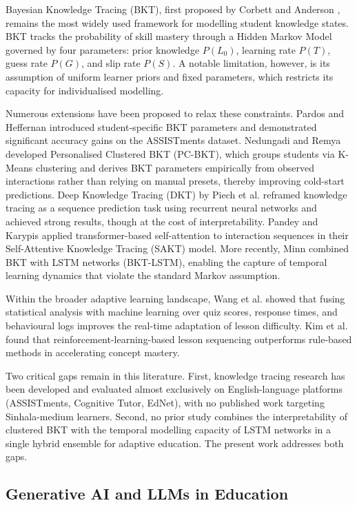 \documentclass[conference]{IEEEtran}
\begin{document}
Bayesian Knowledge Tracing (BKT), first proposed by Corbett and Anderson \cite{b14}, remains the most widely used framework for modelling student knowledge states. BKT tracks the probability of skill mastery through a Hidden Markov Model governed by four parameters: prior knowledge $P(L_0)$, learning rate $P(T)$, guess rate $P(G)$, and slip rate $P(S)$. A notable limitation, however, is its assumption of uniform learner priors and fixed parameters, which restricts its capacity for individualised modelling.

Numerous extensions have been proposed to relax these constraints. Pardos and Heffernan \cite{b15} introduced student-specific BKT parameters and demonstrated significant accuracy gains on the ASSISTments dataset. Nedungadi and Remya \cite{b16} developed Personalised Clustered BKT (PC-BKT), which groups students via K-Means clustering and derives BKT parameters empirically from observed interactions rather than relying on manual presets, thereby improving cold-start predictions. Deep Knowledge Tracing (DKT) by Piech et al. \cite{b17} reframed knowledge tracing as a sequence prediction task using recurrent neural networks and achieved strong results, though at the cost of interpretability. Pandey and Karypis \cite{b18} applied transformer-based self-attention to interaction sequences in their Self-Attentive Knowledge Tracing (SAKT) model. More recently, Minn \cite{b19} combined BKT with LSTM networks (BKT-LSTM), enabling the capture of temporal learning dynamics that violate the standard Markov assumption.

Within the broader adaptive learning landscape, Wang et al. \cite{b20} showed that fusing statistical analysis with machine learning over quiz scores, response times, and behavioural logs improves the real-time adaptation of lesson difficulty. Kim et al. \cite{b21} found that reinforcement-learning-based lesson sequencing outperforms rule-based methods in accelerating concept mastery.

Two critical gaps remain in this literature. First, knowledge tracing research has been developed and evaluated almost exclusively on English-language platforms (ASSISTments, Cognitive Tutor, EdNet), with no published work targeting Sinhala-medium learners. Second, no prior study combines the interpretability of clustered BKT with the temporal modelling capacity of LSTM networks in a single hybrid ensemble for adaptive education. The present work addresses both gaps.

\subsection{Generative AI and LLMs in Education}
\end{document}
